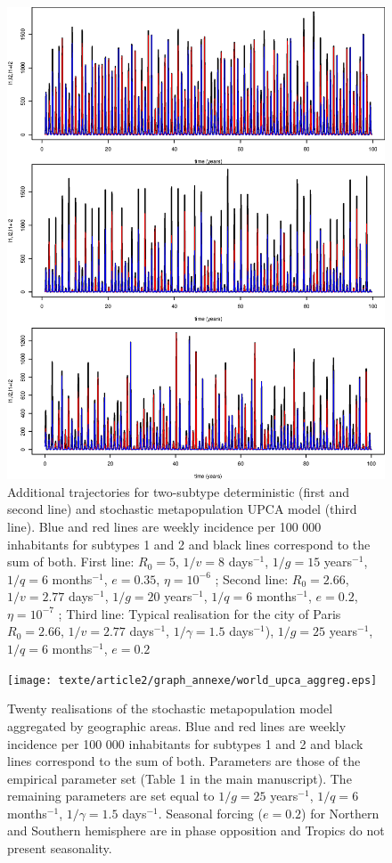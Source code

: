 \begin{figure}[htb]
  \center
  \includegraphics[width= 0.8 \linewidth]{texte/article2/graph_annexe/2strain_traj100.eps}
  \caption{Additional trajectories for two-subtype deterministic
    (first and second line) and stochastic metapopulation UPCA model (third line). Blue and red lines
    are weekly incidence per 100 000 inhabitants for subtypes 1 and 2
    and black lines correspond to the sum of both.
    First line: $R_0=5$, $1/v=8$ days$^{-1}$, $1/g=15$ years$^{-1}$,
    $1/q=6$ months$^{-1}$, $e=0.35$, $\eta=10^{-6}$ ;
    Second line: $R_0=2.66$, $1/v=2.77$ days$^{-1}$, $1/g=20$
    years$^{-1}$, $1/q=6$ months$^{-1}$, $e=0.2$, $\eta=10^{-7}$ ;
    Third line: Typical realisation for the city of Paris $R_0=2.66$, $1/v=2.77$ days$^{-1}$, $1/ \gamma=1.5$
    days$^{-1}$),  $1/g=25$ years$^{-1}$, $1/q=6$ months$^{-1}$, $e=0.2$
  }
  \label{fig:2strain_traj100}
\end{figure}



\begin{figure}[htb]
  \center
  \texttt{[image: texte/article2/graph\_annexe/world\_upca\_aggreg.eps]}
  \caption{Twenty realisations of the stochastic metapopulation model
    aggregated by geographic areas. Blue and red lines are weekly
    incidence per 100 000 inhabitants for subtypes 1 and 2 and black
    lines correspond to the sum of both. Parameters are those of the empirical
    parameter set (Table 1 in the main manuscript). The remaining parameters are set equal to $1/g=25$ years$^{-1}$, $1/q=6$ months$^{-1}$,
    $1/ \gamma=1.5$ days$^{-1}$. Seasonal forcing ($e=0.2$) for
    Northern and Southern hemisphere are in phase opposition
    and Tropics do not present seasonality. }
  \label{fig:world_aggreg}
\end{figure}

